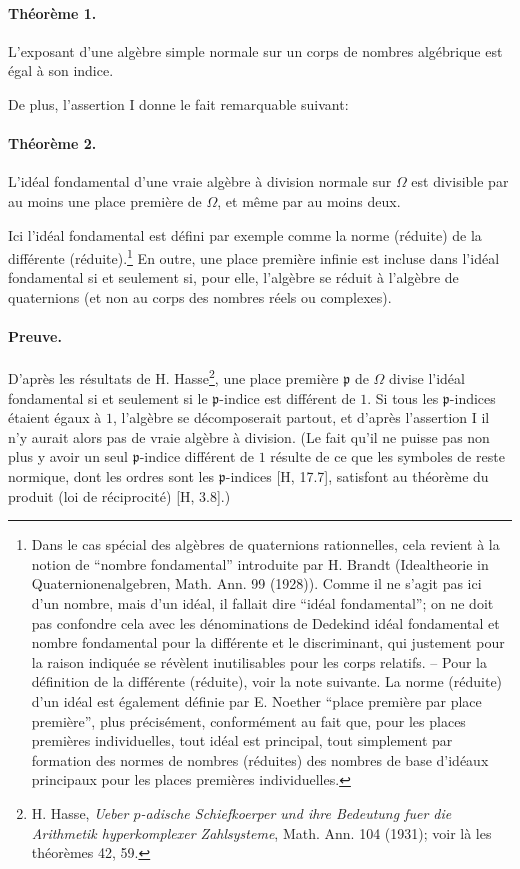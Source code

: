 \paragraph{Théorème 1.}
L'exposant d'une algèbre simple normale sur un corps de nombres algébrique est égal à son indice.

De plus, l'assertion I donne le fait remarquable suivant:

\paragraph{Théorème 2.}
L'idéal fondamental d'une vraie algèbre à division normale sur \(\Omega\) est divisible par au moins une place première de \(\Omega\), et même par au moins deux.

Ici l'idéal fondamental est défini par exemple comme la norme (réduite) de la différente (réduite).\footnote{Dans le cas spécial des algèbres de quaternions rationnelles, cela revient à la notion de ``nombre fondamental'' introduite par H. Brandt (Idealtheorie in Quaternionenalgebren, Math. Ann. 99 (1928)). Comme il ne s'agit pas ici d'un nombre, mais d'un idéal, il fallait dire ``idéal fondamental''; on ne doit pas confondre cela avec les dénominations de Dedekind idéal fondamental et nombre fondamental pour la différente et le discriminant, qui justement pour la raison indiquée se révèlent inutilisables pour les corps relatifs. -- Pour la définition de la différente (réduite), voir la note suivante. La norme (réduite) d'un idéal est également définie par E. Noether ``place première par place première'', plus précisément, conformément au fait que, pour les places premières individuelles, tout idéal est principal, tout simplement par formation des normes de nombres (réduites) des nombres de base d'idéaux principaux pour les places premières individuelles.} En outre, une place première infinie est incluse dans l'idéal fondamental si et seulement si, pour elle, l'algèbre se réduit à l'algèbre de quaternions (et non au corps des nombres réels ou complexes).

\paragraph{Preuve.}
D'après les résultats de H. Hasse\footnote{\label{fn:p38-hasse-padisch}H. Hasse, \emph{Ueber \(p\)-adische Schiefkoerper und ihre Bedeutung fuer die Arithmetik hyperkomplexer Zahlsysteme}, Math. Ann. 104 (1931); voir là les théorèmes 42, 59.}, une place première \(\mathfrak p\) de \(\Omega\) divise l'idéal fondamental si et seulement si le \(\mathfrak p\)-indice est différent de \(1\). Si tous les \(\mathfrak p\)-indices étaient égaux à \(1\), l'algèbre se décomposerait partout, et d'après l'assertion I il n'y aurait alors pas de vraie algèbre à division. (Le fait qu'il ne puisse pas non plus y avoir un seul \(\mathfrak p\)-indice différent de \(1\) résulte de ce que les symboles de reste normique, dont les ordres sont les \(\mathfrak p\)-indices [H, 17.7], satisfont au théorème du produit (loi de réciprocité) [H, 3.8].)

